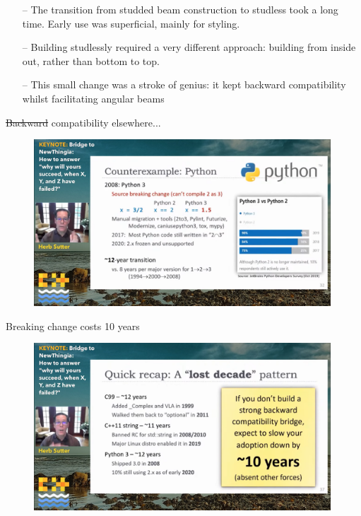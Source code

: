\documentclass[xcolor=dvipsnames]{beamer}
\begin{document}
\begin{frame}[fragile]{}
\begin{itemize}
\item[--] The transition from studded beam construction to studless took a long time. Early use was superficial, mainly for styling. \vspace{3mm}
\item[--] Building studlessly required a very different approach: building from inside out, rather than bottom to top. \vspace{3mm}
\item[--] This small change was a stroke of genius: it kept backward compatibility whilst facilitating angular beams \vspace{3mm}
\end{itemize}
\end{frame}

\begin{frame}[fragile]{\sout{Backward} compatibility elsewhere...}
\begin{figure}[H]
 \centering
 \includegraphics[width=0.99\textwidth]{python_backward_compatibility.png}
\end{figure}
\end{frame}

\begin{frame}[fragile]{Breaking change costs 10 years}
\begin{figure}[H]
 \centering
 \includegraphics[width=0.99\textwidth]{backward_compatibility.png}
\end{figure}
\end{frame}
\end{document}
